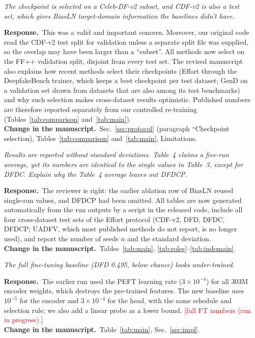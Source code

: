 \documentclass[11pt]{article}
\newif\ifpending\pendingtrue
\newcommand{\pending}[1]{\ifpending\textcolor{red}{[#1]}\else\errmessage{pending: #1}\fi}
\newenvironment{comment}{\par\medskip\noindent\begin{minipage}{\linewidth}\color{black!70}\itshape}{\end{minipage}\par\smallskip}
\newcommand{\resp}{\noindent\textbf{Response.}~}
\newcommand{\change}{\noindent\textbf{Change in the manuscript.}~}
\begin{document}
\begin{comment}
The checkpoint is selected on a Celeb-DF-v2 subset, and CDF-v2 is also a test set, which gives BiasLN target-domain information the baselines didn't have.
\end{comment}
\resp This was a valid and important concern. Moreover, our original code read the CDF-v2 test split for validation unless a separate split file was supplied, so the overlap may have been larger than a ``subset''. All methods now select on the FF++ validation split, disjoint from every test set. The revised manuscript also explains how recent methods select their checkpoints (Effort through the DeepfakeBench trainer, which keeps a best checkpoint per test dataset; GenD on a validation set drawn from datasets that are also among its test benchmarks) and why such selection makes cross-dataset results optimistic. Published numbers are therefore reported separately from our controlled re-training (Tables~\ref{tab:comparison} and~\ref{tab:main}).\\
\change Sec.~\ref{sec:protocol} (paragraph ``Checkpoint selection), Tables~\ref{tab:comparison} and~\ref{tab:main}, Limitations.

\begin{comment}
Results are reported without standard deviations. Table~4 claims a five-run average, yet its numbers are identical to the single values in Table~3, except for DFDC. Explain why the Table~4 average leaves out DFDCP.
\end{comment}
\resp The reviewer is right: the earlier ablation row of BiasLN reused single-run values, and DFDCP had been omitted. All tables are now generated automatically from the run outputs by a script in the released code, include all four cross-dataset test sets of the Effort protocol (CDF-v2, DFD, DFDC, DFDCP; UADFV, which most published methods do not report, is no longer used), and report the number of seeds $n$ and the standard deviation.\\
\change Tables~\ref{tab:main}, \ref{tab:roles}--\ref{tab:indomain}.

\begin{comment}
The full fine-tuning baseline (DFD 0.495, below chance) looks under-trained.
\end{comment}
\resp The earlier run used the PEFT learning rate ($3\times10^{-4}$) for all 303M encoder weights, which destroys the pre-trained features. The new baseline uses $10^{-5}$ for the encoder and $3\times10^{-4}$ for the head, with the same schedule and selection rule; we also add a linear probe as a lower bound. \pending{full FT numbers (run in progress).}\\
\change Table~\ref{tab:main}, Sec.~\ref{sec:impl}.
\end{document}
